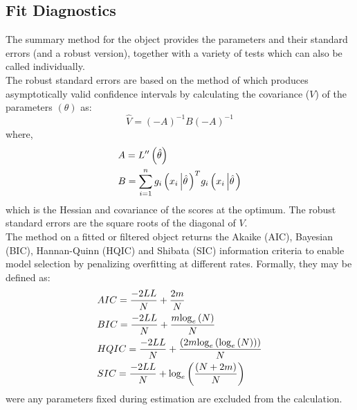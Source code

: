 \subsection{Fit Diagnostics}\label{section:diagnostics}
The summary method for the \verb@uGARCHfit@ object provides the parameters and
their standard errors (and a robust version), together with a variety of tests
which can also be called individually.\\
The robust standard errors are based on the method of \cite{White1982} which produces
asymptotically valid confidence intervals by calculating the covariance ($V$) of the
parameters $(\theta)$ as:
\begin{equation}
\hat V =  {\left( -A \right)^{ - 1}}B{\left( { - A} \right)^{ - 1}}
\end{equation}
where,
\begin{equation}
\begin{gathered}
  A = L''\left( {\hat \theta } \right) \hfill \\
  B = {\sum\limits_{i = 1}^n {{g_i}\left( {{x_i}\left| {\hat \theta } \right.} \right)} ^T}{g_i}\left( {{x_i}\left| {\hat \theta } \right.} \right) \hfill \\
\end{gathered}
\end{equation}
which is the Hessian and covariance of the scores at the optimum.
The robust standard errors are the square roots of the diagonal of $V$.\\
The \verb@inforcriteria@ method on a fitted or filtered object returns the
Akaike (AIC), Bayesian (BIC), Hannan-Quinn (HQIC) and Shibata (SIC) information
criteria to enable model selection by penalizing overfitting at different rates.
Formally, they may be defined as:
\begin{equation}\label{inforcriteria}
\begin{gathered}
  AIC = \frac{{ - 2LL}}
{N} + \frac{{2m}}
{N} \hfill \\
  BIC = \frac{{ - 2LL}}
{N} + \frac{{m{{\log }_e}\left( N \right)}}
{N} \hfill \\
  HQIC = \frac{{ - 2LL}}
{N} + \frac{{\left( {2m{{\log }_e}\left( {{{\log }_e}\left( N \right)} \right)} \right)}}
{N} \hfill \\
  SIC = \frac{{ - 2LL}}
{N} + {\log _e}\left( {\frac{{\left( {N + 2m} \right)}}
{N}} \right) \hfill \\
\end{gathered}
\end{equation}
were any parameters fixed during estimation are excluded from the calculation.
